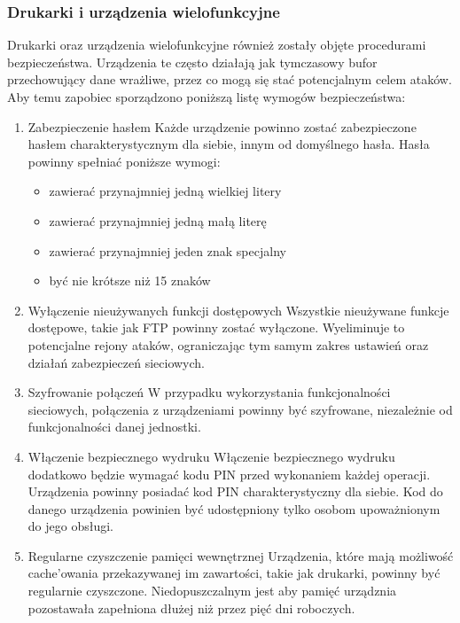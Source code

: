 \documentclass[12pt,a4paper]{article}
\begin{document}
\subsubsection{Drukarki i urządzenia
wielofunkcyjne}\label{drukarki-i-urzux105dzenia-wielofunkcyjne}

Drukarki oraz urządzenia wielofunkcyjne również zostały objęte procedurami bezpieczeństwa. Urządzenia te często działają jak tymczasowy bufor przechowujący dane wrażliwe, przez co mogą się stać potencjalnym celem ataków. Aby temu zapobiec sporządzono poniższą listę wymogów bezpieczeństwa:
\begin{enumerate}
    \item Zabezpieczenie hasłem Każde urządzenie powinno zostać zabezpieczone hasłem charakterystycznym dla siebie, innym od domyślnego hasła. Hasła powinny spełniać poniższe wymogi:
    \begin{itemize}
        \item zawierać przynajmniej jedną wielkiej litery
        \item zawierać przynajmniej jedną małą literę
        \item zawierać przynajmniej jeden znak specjalny
        \item być nie krótsze niż 15 znaków
    \end{itemize}
    \item Wyłączenie nieużywanych funkcji dostępowych Wszystkie nieużywane funkcje dostępowe, takie jak FTP powinny zostać wyłączone. Wyeliminuje to potencjalne rejony ataków, ograniczając tym samym zakres ustawień oraz działań zabezpieczeń sieciowych.
    \item Szyfrowanie połączeń W przypadku wykorzystania funkcjonalności sieciowych, połączenia z urządzeniami powinny być szyfrowane, niezależnie od funkcjonalności danej jednostki.
    \item Włączenie bezpiecznego wydruku Włączenie bezpiecznego wydruku dodatkowo będzie wymagać kodu PIN przed wykonaniem każdej operacji. Urządzenia powinny posiadać kod PIN charakterystyczny dla siebie. Kod do danego urządzenia powinien być udostępniony tylko osobom upoważnionym do jego obsługi.
    \item Regularne czyszczenie pamięci wewnętrznej Urządzenia, które mają możliwość cache'owania przekazywanej im zawartości, takie jak drukarki, powinny być regularnie czyszczone. Niedopuszczalnym jest aby pamięć urządznia pozostawała zapełniona dłużej niż przez pięć dni roboczych.

\end{enumerate}
\end{document}

